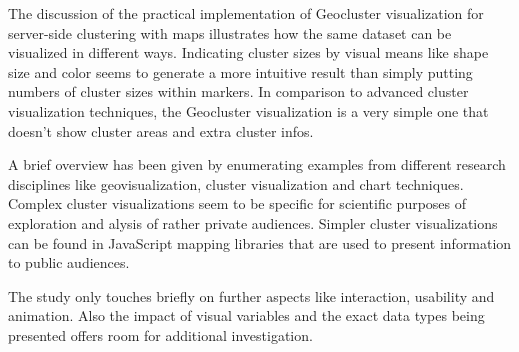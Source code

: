 The discussion of the practical implementation of Geocluster visualization for server-side clustering with maps illustrates how the same dataset can be visualized in different ways. Indicating cluster sizes by visual means like shape size and color seems to generate a more intuitive result than simply putting numbers of cluster sizes within markers. In comparison to advanced cluster visualization techniques, the Geocluster visualization is a very simple one that doesn't show cluster areas and extra cluster infos.

A brief overview has been given by enumerating examples from different research disciplines like geovisualization, cluster visualization and chart techniques. Complex cluster visualizations seem to be specific for scientific purposes of exploration and alysis of rather private audiences. Simpler cluster visualizations can be found in JavaScript mapping libraries that are used to present information to public audiences.

The study only touches briefly on further aspects like interaction, usability and animation. Also the impact of visual variables and the exact data types being presented offers room for additional investigation. 



